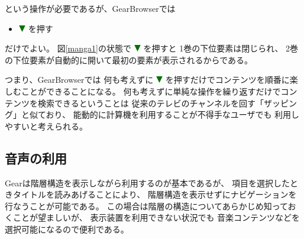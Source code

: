 \documentclass[twoside]{wiss}
\def\GEAR{\textsf{Gear}}
\def\GB{\textsf{GearBrowser}}
\def\down{ \includegraphics[width=3mm,bb=0 0 36 36]{figures/downtriangle.pdf} }
\begin{document}
\noindent
という操作が必要であるが、{\GB}では

\begin{itemize}
\item {\down}を押す
\end{itemize}

\noindent
だけでよい。
図\ref{manga1}の状態で{\down}を押すと
1巻の下位要素は閉じられ、
2巻の下位要素が自動的に開いて最初の要素が表示されるからである。

つまり、{\GB}では
何も考えずに
{\down}を押すだけでコンテンツを順番に楽しむことができることになる。
何も考えずに単純な操作を繰り返すだけでコンテンツを検索できるということは
従来のテレビのチャンネルを回す「ザッピング」と似ており、
能動的に計算機を利用することが不得手なユーザでも
利用しやすいと考えられる。


\subsection{音声の利用}

{\GEAR}は階層構造を表示しながら利用するのが基本であるが、
項目を選択したときタイトルを読みあげることにより、
階層構造を表示せずにナビゲーションを行なうことが可能である。
この場合は階層の構造についてあらかじめ知っておくことが望ましいが、
表示装置を利用できない状況でも
音楽コンテンツなどを選択可能になるので便利である。

% 


% 
\end{document}
